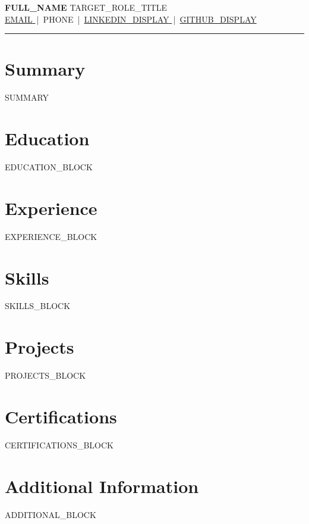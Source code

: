 \documentclass[a4paper,10pt]{article}
\begin{document}
\noindent
{\Large\bfseries {{FULL_NAME}} } \hfill {\small {{TARGET_ROLE_TITLE}} }\\[2pt]
{\small
  \href{mailto:{{EMAIL}}}{ {{EMAIL}} } \,|\, {{PHONE}} \,|\,
  \href{ {{LINKEDIN_URL}} }{ {{LINKEDIN_DISPLAY}} } \,|\,
  \href{ {{GITHUB_URL}} }{ {{GITHUB_DISPLAY}} }
}
\vspace{4pt}
\hrule
\vspace{10pt}

\section*{Summary}
{{SUMMARY}}

\section*{Education}
{{EDUCATION_BLOCK}}

\section*{Experience}
{{EXPERIENCE_BLOCK}}

\section*{Skills}
{{SKILLS_BLOCK}}

\section*{Projects}
{{PROJECTS_BLOCK}}

\section*{Certifications}
{{CERTIFICATIONS_BLOCK}}

\section*{Additional Information}
{{ADDITIONAL_BLOCK}}
\end{document}
